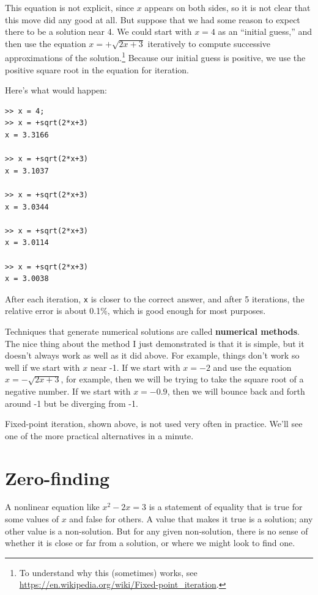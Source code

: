 \documentclass[
]{book}
\begin{document}
This equation is not explicit, since $x$ appears on both sides, so
it is not clear that this move did any good at all.  But suppose
that we had some reason to expect there to be a solution near 4.
We could start with $x=4$ as an ``initial guess,'' and then use
the equation $x = + \sqrt{2x+3}$ iteratively to compute successive
approximations of the solution.\footnote{To understand why this
(sometimes) works, see
\url{https://en.wikipedia.org/wiki/Fixed-point_iteration}.}
Because our initial guess is positive, we use the positive square root in the equation for iteration.  

Here's what would happen:

\begin{verbatim}
>> x = 4;
>> x = +sqrt(2*x+3)
x = 3.3166

>> x = +sqrt(2*x+3)
x = 3.1037

>> x = +sqrt(2*x+3)
x = 3.0344

>> x = +sqrt(2*x+3)
x = 3.0114

>> x = +sqrt(2*x+3)
x = 3.0038
\end{verbatim}

After each iteration, {\tt x} is closer to the correct answer,
and after 5 iterations, the relative error is about 0.1\%, which
is good enough for most purposes.

Techniques that generate numerical solutions are called
{\bf numerical methods}.  
The nice thing about the method I
just demonstrated is that it is simple, but it doesn't always
work as well as it did above.
For example, things don't work so well if we start with $x$ near -1. If we start with $x=-2$ and use
the equation $x = - \sqrt{2x+3}$, for example, then we will be trying to take the square root 
of a negative number.  If we start with $x=-0.9$, then we will bounce back and forth around -1 
but be diverging from -1.  

Fixed-point iteration, shown above, is not used
very often in practice.  We'll see one of
the more practical alternatives in a minute.



\section{Zero-finding}
\label{sect:zero}

A nonlinear equation like $x^2 - 2x = 3$ is a statement of
equality that is true for some values of $x$ and false for
others.  A value that makes it true is a solution;
any other value is a non-solution.  But for any given non-solution,
there is no sense of whether it is close or far from a solution,
or where we might look to find one.
\end{document}

